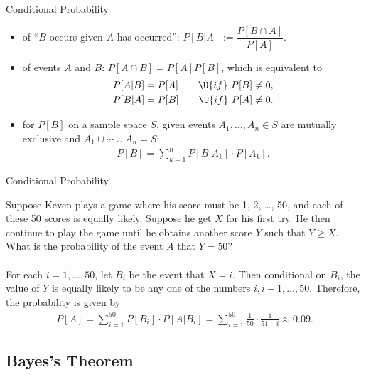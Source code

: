 \begin{frame}{Conditional Probability}

\begin{itemize}
	\justifying
	\item {} of ``$B$ occurs given $A$ has occurred'': $P[B|A] := \dfrac{P[B\cap A]}{P[A]}$.
	\item {} of events $A$ and $B$: $P[A\cap B] = P[A]P[B]$, which is equivalent to
	\begin{align*}
	P[A|B] = P[A] \qquad \U{if}\ P[B]\neq 0, \\
	P[B|A] = P[B] \qquad \U{if}\ P[A]\neq 0.
	\end{align*}
	\item {} for $P[B]$ on a sample space $S$, given events $A_1, \ldots, A_n \in S$ are mutually exclusive and $A_1\cup\cdots\cup A_n = S$:
	\begin{align*}
	P[B] = \sum_{k=1}^{n} P[B|A_k]\cdot P[A_k].
	\end{align*}
\end{itemize}

\end{frame}

\begin{frame}{Conditional Probability}

\justifying
{} Suppose Keven plays a game where his score must be 1, 2, \ldots, 50, and each of these 50 scores is equally likely. Suppose he get $X$ for his first try. He then continue to play the game until he obtains another score $Y$ such that $Y\geq X$. What is the probability of the event $A$ that $Y = 50$?
~\\
~\\
\pause
\justifying
{} For each $i = 1, \ldots, 50$, let $B_i$ be the event that $X = i$. Then conditional on $B_i$, the value of $Y$ is equally likely to be any one of the numbers $i, i + 1, \ldots, 50$. Therefore, the probability is given by
\begin{align*}
P[A] = \sum_{i=1}^{50} P[B_i]\cdot P[A|B_i] = \sum_{i=1}^{50} \frac{1}{50}\cdot \frac{1}{51-i} \approx 0.09.
\end{align*}

\end{frame}


\subsection{Bayes's Theorem}

